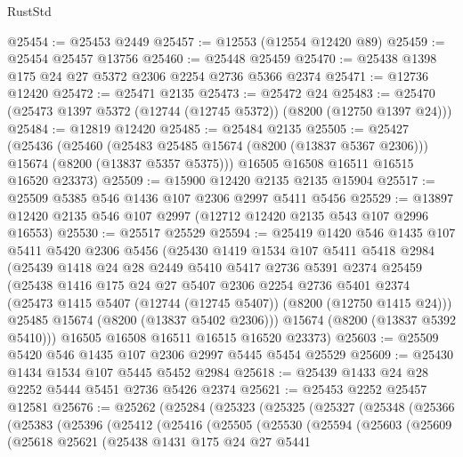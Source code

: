 \begin{lexlean}{RustStd}
\begin{coremodule}
@25454 := @25453 @2449
@25457 := @12553 (@12554 @12420 @89)
@25459 := @25454 @25457 @13756
@25460 := @25448 @25459
@25470 := @25438 @1398 @175 @24 @27 @5372 @2306 @2254 @2736 @5366 @2374
@25471 := @12736 @12420
@25472 := @25471 @2135
@25473 := @25472 @24
@25483 := @25470 (@25473 @1397 @5372 (@12744 (@12745 @5372)) (@8200 (@12750 @1397 @24)))
@25484 := @12819 @12420
@25485 := @25484 @2135
@25505 := @25427
    (@25436
      (@25460
        (@25483 @25485 @15674 (@8200 (@13837 @5367 @2306)))
        @15674
        (@8200 (@13837 @5357 @5375)))
      @16505
      @16508
      @16511
      @16515
      @16520
      @23373)
@25509 := @15900 @12420 @2135 @2135 @15904
@25517 := @25509 @5385 @546 @1436 @107 @2306 @2997 @5411 @5456
@25529 := @13897 @12420 @2135 @546 @107 @2997 (@12712 @12420 @2135 @543 @107 @2996 @16553)
@25530 := @25517 @25529
@25594 := @25419
    @1420
    @546
    @1435
    @107
    @5411
    @5420
    @2306
    @5456
    (@25430
      @1419
      @1534
      @107
      @5411
      @5418
      @2984
      (@25439
        @1418
        @24
        @28
        @2449
        @5410
        @5417
        @2736
        @5391
        @2374
        @25459
        (@25438
          @1416
          @175
          @24
          @27
          @5407
          @2306
          @2254
          @2736
          @5401
          @2374
          (@25473 @1415 @5407 (@12744 (@12745 @5407)) (@8200 (@12750 @1415 @24)))
          @25485
          @15674
          (@8200 (@13837 @5402 @2306)))
        @15674
        (@8200 (@13837 @5392 @5410)))
      @16505
      @16508
      @16511
      @16515
      @16520
      @23373)
@25603 := @25509 @5420 @546 @1435 @107 @2306 @2997 @5445 @5454 @25529
@25609 := @25430 @1434 @1534 @107 @5445 @5452 @2984
@25618 := @25439 @1433 @24 @28 @2252 @5444 @5451 @2736 @5426 @2374
@25621 := @25453 @2252 @25457 @12581
@25676 := @25262
    (@25284
      (@25323
        (@25325
          (@25327
            (@25348
              (@25366
                (@25383
                  (@25396
                    (@25412
                      (@25416
                        (@25505
                          (@25530
                            (@25594
                              (@25603
                                (@25609
                                  (@25618
                                    @25621
                                    (@25438
                                      @1431
                                      @175
                                      @24
                                      @27
                                      @5441

\end{coremodule}
\end{lexlean}
